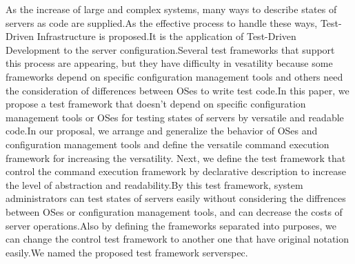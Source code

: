 \begin{eabstract}
As the increase of large and complex systems, many ways to describe states of servers as code are supplied.As the effective process to handle these ways, Test-Driven Infrastructure is proposed.It is the application of Test-Driven Development to the server configuration.Several test frameworks that support this process are appearing, but they have difficulty in vesatility because some frameworks depend on specific configuration management tools and others need the consideration of differences between OSes to write test code.In this paper, we propose a test framework that doesn't depend on specific configuration management tools or OSes for testing states of servers by versatile and readable code.In our proposal, we arrange and generalize the behavior of OSes and configuration management tools and define the versatile command execution framework for increasing the versatility. Next, we define the test framework that control the command execution framework by declarative description to increase the level of abstraction and readability.By this test framework, system administrators can test states of servers easily without considering the diffrences between OSes or configuration management tools, and can decrease the costs of server operations.Also by defining the frameworks separated into purposes, we can change the control test framework to another one that have original notation easily.We named the proposed test framework serverspec.
\end{eabstract}
